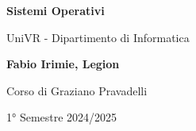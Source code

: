 \begin{titlepage}
	\begin{center}
		\vspace*{1cm}

		\Huge
		\textbf{Sistemi Operativi}

		\vspace{0.5cm}
		\LARGE
		UniVR - Dipartimento di Informatica

		\vspace{1.5cm}

		\textbf{Fabio Irimie, Legion}

		\vfill


		\vspace{0.8cm}

    Corso di Graziano Pravadelli

		1° Semestre 2024/2025

	\end{center}
\end{titlepage}
